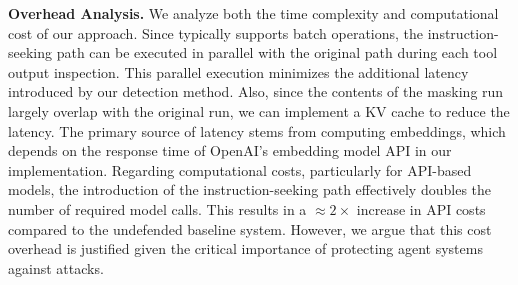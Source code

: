 \textbf{Overhead Analysis.}
We analyze both the time complexity and computational cost of our approach. Since \llm typically supports batch operations, the instruction-seeking path can be executed in parallel with the original path during each tool output inspection. This parallel execution minimizes the additional latency introduced by our detection method. Also, since the contents of the masking run largely overlap with the original run, we can implement a KV cache to reduce the latency. The primary source of latency stems from computing embeddings, which depends on the response time of OpenAI's embedding model API in our implementation.
Regarding computational costs, particularly for API-based models, the introduction of the instruction-seeking path effectively doubles the number of required model calls. This results in a $\approx 2\times$ increase in API costs compared to the undefended baseline system. However, we argue that this cost overhead is justified given the critical importance of protecting agent systems against \ipi attacks.


























